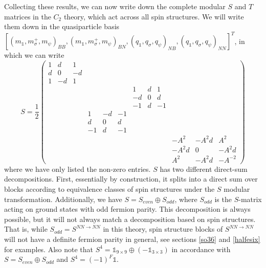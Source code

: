 \documentclass[12pt,a4paper]{article}
\newcounter{arrow}
\newcommand{\ra}{\rightarrow}
\newcommand{\unit}{\mathds{1}}
\newcommand\be            {\begin{equation}}
\newcommand\ee            {\end{equation}}
\begin{document}
\medskip

Collecting these results, we can now write down the complete modular $S$ and $T$ matrices in the $C_2$ theory, 
which act across all spin structures. 
We will write them down in the quasiparticle 
basis $[(m_\unit,m_\sigma^+,m_\psi)_{BB},(m_\unit,m_\sigma^+,m_\psi)_{BN},(q_\unit,q_\sigma,q_\psi)_{NB},(q_\unit,q_\sigma,q_\psi)_{NN}]^T$, 
in which we can write
\be \label{modularS}
S = \frac{1}{2}\begin{pmatrix} 1 & d & 1 &			&&&			&&&			&& \\ 
					      d & 0 &-d &			&&&			&&&			&&\\
					      1&-d&1 & 			&&&			&&&			&&\\
						&&&				&&&			1&d&1&		&& \\
						&&&				&&&			-d&0&d&		&&\\
						&&&				&&&			-1&d&-1&		&&\\
						&&&				1&-d&-1&		&&&			&&\\
						&&&				d&0&d&		&&&			&&\\
						&&&				-1&d&-1&		&&&			&&\\
						&&&				&&&			&&&			-A^{2} & -A^{2}d & A^{2}\\
						&&&				&&&			&&&			-A^{2}d & 0 & -A^{2}d \\ 
						&&&				&&&			&&&			A^{2} & -A^{2}d & -A^{-2} \end{pmatrix}\ee		
where we have only listed the non-zero entries. 
$S$ has two different direct-sum decompositions. First, essentially by construction, 
it splits into a direct sum over blocks according to equivalence classes of spin structures 
under the $S$ modular transformation. 
Additionally, we have $S = S_{even} \oplus S_{odd}$, where $S_{odd}$ is the $S$-matrix 
acting on ground states with odd fermion parity.
This decomposition is always possible, but it will not always match a decomposition based 
on spin structures. 
That is, while $S_{odd} = S^{NN\ra NN}$ in this theory, spin structure blocks of $S^{NN\ra NN}$ 
will not have a definite fermion parity in general, see sections \ref{so36} and \ref{halfesix} for examples. 
Also note that $S^4 = \unit_{9\times9}\oplus(-\unit_{3\times3})$ in accordance with $S = S_{even} \oplus S_{odd}$ and $S^4=(-1)^F\unit$. 
\end{document}
